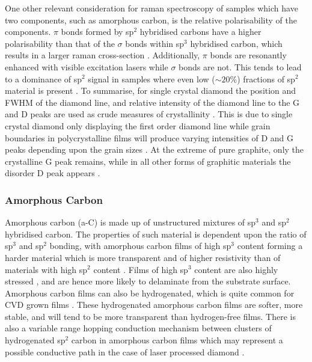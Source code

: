 \begin{refsection}
One other relevant consideration for raman spectroscopy of samples which have two components, such as amorphous carbon, is the relative polarisability of the components. $\pi$ bonds formed by sp$^{2}$ hybridised carbons have a higher polarisability than that of the $\sigma$ bonds within sp$^{3}$ hybridised carbon, which results in a larger raman cross-section \cite{Zhang2022}. Additionally, $\pi$ bonds are resonantly enhanced with visible excitation lasers while $\sigma$ bonds are not. This tends to lead to a dominance of sp$^{2}$ signal in samples where even low ($\sim20$\%) fractions of sp$^{2}$ material is present \cite{Ferrari2004}. 
To summarise, for single crystal diamond the position and FWHM of the diamond line, and relative intensity of the diamond line to the G and D peaks are used as crude measures of crystallinity \cite{Bennett2024}. This is due to single crystal diamond only displaying the first order diamond line while grain boundaries in polycrystalline films will produce varying intensities of D and G peaks depending upon the grain sizes \cite{Bachmann1994}. At the extreme of pure graphite, only the crystalline G peak remains, while in all other forms of graphitic materials the disorder D peak appears \cite{Tuinstra1970}. 

\subsubsection{Amorphous Carbon}
Amorphous carbon (a-C) is made up of unstructured mixtures of sp$^{3}$ and sp$^{2}$ hybridised carbon. The properties of such material is dependent upon the ratio of sp$^{3}$ and sp$^{2}$ bonding, with amorphous carbon films of high sp$^{3}$ content forming a harder material which is more transparent and of higher resistivity than of materials with high sp$^{2}$ content \cite{Suzuki20042}. Films of high sp$^{3}$ content are also highly stressed \cite{Marques2000}, and are hence more likely to delaminate from the substrate surface. Amorphous carbon films can also be hydrogenated, which is quite common for CVD grown films \cite{Robertson1996}. These hydrogenated amorphous carbon films are softer, more stable, and will tend to be more transparent than hydrogen-free films. There is also a variable range hopping conduction mechanism between clusters of hydrogenated sp$^{2}$ carbon in amorphous carbon films which may represent a possible conductive path in the case of laser processed diamond \cite{Tomidokoro2021}.


\end{refsection}
